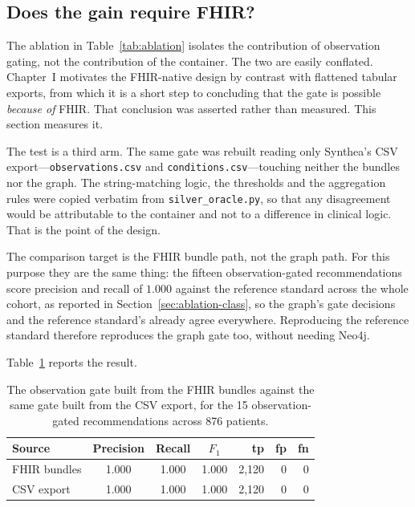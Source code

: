 \subsection{Does the gain require FHIR?}
\label{sec:csv-gating}
The ablation in Table~\ref{tab:ablation} isolates the contribution of observation gating, not
the contribution of the container. The two are easily conflated. Chapter~I motivates the
FHIR-native design by contrast with flattened tabular exports, from which it is a short step to
concluding that the gate is possible \emph{because of} FHIR. That conclusion was asserted rather
than measured. This section measures it.

The test is a third arm. The same gate was rebuilt reading only Synthea's CSV
export---\texttt{observations.csv} and \texttt{conditions.csv}---touching neither the bundles nor
the graph. The string-matching logic, the thresholds and the aggregation rules were copied
verbatim from \texttt{silver\_oracle.py}, so that any disagreement would be attributable to the
container and not to a difference in clinical logic. That is the point of the design.

The comparison target is the FHIR bundle path, not the graph path. For this purpose they are the
same thing: the fifteen observation-gated recommendations score precision and recall of $1.000$
against the reference standard across the whole cohort, as reported in
Section~\ref{sec:ablation-class}, so the graph's gate decisions and the reference standard's
already agree everywhere. Reproducing the reference standard therefore reproduces the graph gate
too, without needing Neo4j.

Table~\ref{tab:csv-gating} reports the result.

\begin{table}[h]
\centering
\caption{The observation gate built from the FHIR bundles against the same gate built from the
CSV export, for the 15 observation-gated recommendations across 876 patients.}
\label{tab:csv-gating}
\begin{tabular}{lcccrrr}
\hline
\textbf{Source} & \textbf{Precision} & \textbf{Recall} & \textbf{$F_1$} &
\textbf{tp} & \textbf{fp} & \textbf{fn} \\
\hline
FHIR bundles & 1.000 & 1.000 & 1.000 & 2{,}120 & 0 & 0 \\
CSV export   & 1.000 & 1.000 & 1.000 & 2{,}120 & 0 & 0 \\
\hline
\end{tabular}
\end{table}

